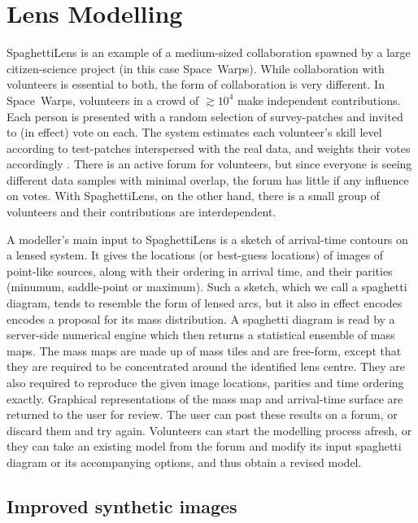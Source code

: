 \documentclass[fleqn,usenatbib]{mnras}
\begin{document}
\section{Lens Modelling}\label{sec:spl}

SpaghettiLens is an example of a medium-sized collaboration spawned by
a large citizen-science project (in this case Space~Warps).  While
collaboration with volunteers is essential to both, the form of
collaboration is very different.  In Space~Warps, volunteers in a
crowd of $\gtrsim10^4$ make independent contributions.  Each person is
presented with a random selection of survey-patches and invited to (in
effect) vote on each.  The system estimates each volunteer's skill
level according to test-patches interspersed with the real data, and
weights their votes accordingly \citep{2016MNRAS.455.1171M}.  There is
an active forum for volunteers, but since everyone is seeing different
data samples with minimal overlap, the forum has little if any
influence on votes.  With SpaghettiLens, on the other hand, there is a
small group of volunteers and their contributions are interdependent.

A modeller's main input to SpaghettiLens is a sketch of arrival-time
contours on a lensed system.  It gives the locations (or best-guess
locations) of images of point-like sources, along with their ordering
in arrival time, and their parities (minumum, saddle-point or
maximum).  Such a sketch, which we call a spaghetti diagram, tends to
resemble the form of lensed arcs, but it also in effect encodes
encodes a proposal for its mass distribution.  A spaghetti diagram is
read by a server-side numerical engine \citep[GLASS, developed
  by][]{2014MNRAS.445.2181C} which then returns a statistical ensemble
of mass maps.  The mass maps are made up of mass tiles and are
free-form, except that they are required to be concentrated around the
identified lens centre.  They are also required to reproduce the given
image locations, parities and time ordering exactly.  Graphical
representations of the mass map and arrival-time surface are returned
to the user for review.  The user can post these results on a forum,
or discard them and try again.  Volunteers can start the modelling
process afresh, or they can take an existing model from the forum and
modify its input spaghetti diagram or its accompanying options, and
thus obtain a revised model.

\subsection{Improved synthetic images}\label{subsec:sourcefit}
\end{document}
